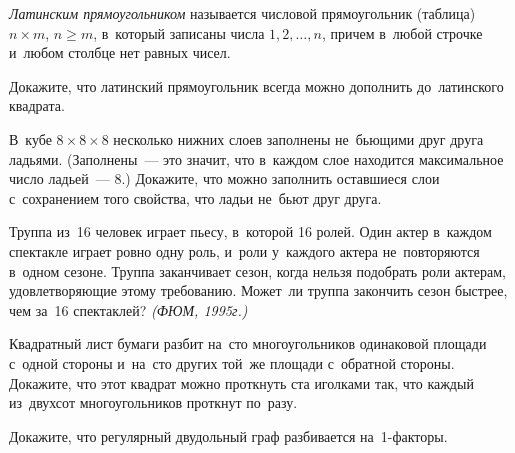 \emph{Латинским прямоугольником} называется числовой прямоугольник (таблица)
$n \times m$, $n \geq m$, в~который записаны числа $1, 2, \ldots, n$, причем
в~любой строчке и~любом столбце нет равных чисел.

\begin{problems}

\item
Докажите, что латинский прямоугольник всегда можно дополнить до~латинского
квадрата.

\item
В~кубе $8 \times 8 \times 8$ несколько нижних слоев заполнены не~бьющими друг
друга ладьями.
(Заполнены~--- это значит, что в~каждом слое находится максимальное число
ладьей~--- 8.)
Докажите, что можно заполнить оставшиеся слои с~сохранением того свойства, что
ладьи не~бьют друг друга.

\item
Труппа из~16 человек играет пьесу, в~которой 16 ролей.
Один актер в~каждом спектакле играет ровно одну роль, и~роли у~каждого актера
не~повторяются в~одном сезоне.
Труппа заканчивает сезон, когда нельзя подобрать роли актерам, удовлетворяющие
этому требованию.
Может~ли труппа закончить сезон быстрее, чем за~16 спектаклей?
\emph{(ФЮМ, 1995г.)}

\item
Квадратный лист бумаги разбит на~сто многоугольников одинаковой площади с~одной
стороны и~на~сто других той~же площади с~обратной стороны.
Докажите, что этот квадрат можно проткнуть ста иголками так, что каждый
из~двухсот многоугольников проткнут по~разу.

\item
Докажите, что регулярный двудольный граф разбивается на~1-факторы.

\end{problems}

\endgroup %

